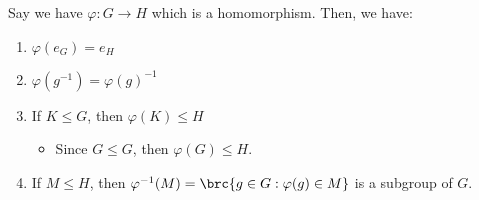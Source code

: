 \documentclass[openany]{book}
\begin{document}
\begin{prop}
	Say we have $\varphi : G \rightarrow H$ which is a homomorphism. Then, we have:
	\begin{enumerate}
		\item $\varphi(e_G) = e_H$
		\item $\varphi(g^{-1}) = \varphi(g)^{-1}$
		\item If $K \leq G$, then $\varphi(K) \leq H$
		\begin{itemize}
			\item Since $G \leq G$, then $\varphi(G) \leq H$.
		\end{itemize}
		\item If $M \leq H$, then $\varphi^{-1}(M) = \brc{g \in G : \varphi(g) \in M}$ is a subgroup of $G$.
	\end{enumerate}
\end{prop}
\end{document}
